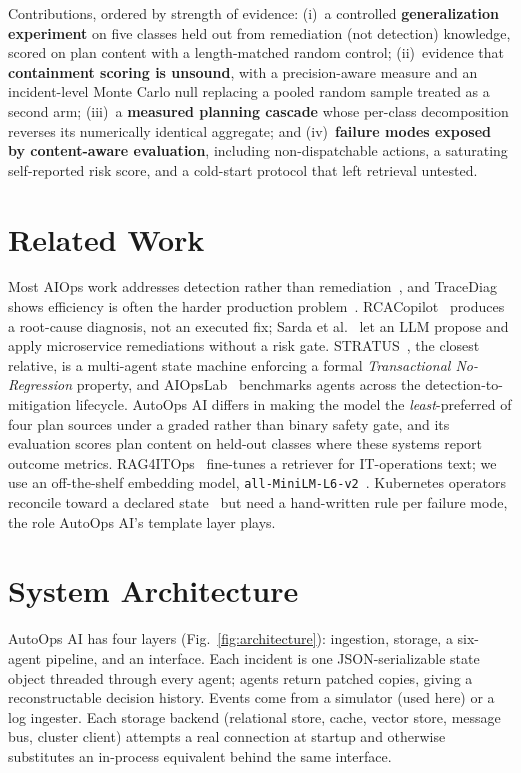 \documentclass[conference]{IEEEtran}
\begin{document}
Contributions, ordered by strength of evidence: (i)~a controlled
\textbf{generalization experiment} on five classes held out from
remediation (not detection) knowledge, scored on plan content with a
length-matched random control; (ii)~evidence that \textbf{containment
scoring is unsound}, with a precision-aware measure and an
incident-level Monte Carlo null replacing a pooled random sample treated
as a second arm; (iii)~a \textbf{measured planning cascade} whose
per-class decomposition reverses its numerically identical aggregate;
and (iv)~\textbf{failure modes exposed by content-aware evaluation},
including non-dispatchable actions, a saturating self-reported risk
score, and a cold-start protocol that left retrieval untested.

\section{Related Work}

Most AIOps work addresses detection rather than
remediation~\cite{aiops-survey,aiops-llm-survey}, and TraceDiag shows
efficiency is often the harder production problem~\cite{tracediag}.
RCACopilot~\cite{rcacopilot} produces a root-cause diagnosis, not an
executed fix; Sarda et al.~\cite{sarda-autoremediation} let an LLM
propose and apply microservice remediations without a risk gate.
STRATUS~\cite{stratus}, the closest relative, is a multi-agent state
machine enforcing a formal \emph{Transactional No-Regression} property,
and AIOpsLab~\cite{aiopslab} benchmarks agents across the
detection-to-mitigation lifecycle. AutoOps AI differs in making the model
the \emph{least}-preferred of four plan sources under a graded rather
than binary safety gate, and its evaluation scores plan content on
held-out classes where these systems report outcome metrics.
RAG4ITOps~\cite{rag4itops} fine-tunes a retriever for IT-operations
text; we use an off-the-shelf embedding model,
\texttt{all-MiniLM-L6-v2}~\cite{sbert}. Kubernetes operators reconcile
toward a declared state~\cite{borg-omega-k8s} but need a hand-written
rule per failure mode, the role AutoOps AI's template layer plays.

\section{System Architecture}

AutoOps AI has four layers (Fig.~\ref{fig:architecture}): ingestion,
storage, a six-agent pipeline, and an interface. Each incident is one
JSON-serializable state object threaded through every agent; agents
return patched copies, giving a reconstructable decision history. Events
come from a simulator (used here) or a log ingester. Each storage backend
(relational store, cache, vector store, message bus, cluster client)
attempts a real connection at startup and otherwise substitutes an
in-process equivalent behind the same interface.
\end{document}
